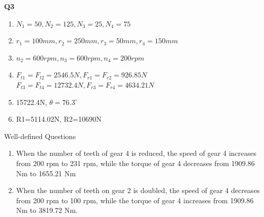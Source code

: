 \documentclass[a4paper, fleqn]{article}
\begin{document}
\textbf{Q3}

\begin{enumerate}
    \item $N_1=50, N_2=125, N_3=25, N_4=75$
    \item $r_1=100mm, r_2=250mm, r_3=50mm, r_4=150mm$
    \item $n_2=600rpm, n_3=600rpm, n_4=200rpm$
    \item $F_{t1}=F_{t2}=2546.5N, F_{r1}=F_{r2}=926.85N$\\
    $F_{t3}=F_{t4}=12732.4N, F_{r3}=F_{r4}=4634.21N$
    \item 15722.4N, $\theta=76.3^\circ$
    \item R1=5114.02N, R2=10690N
\end{enumerate}

Well-defined Questions
\begin{enumerate}[label=(\roman*)]
    \item When the number of teeth of gear 4 is reduced, the speed of gear 4 increases
from 200 rpm to 231 rpm, while the torque of gear 4 decreases from 1909.86 Nm
to 1655.21 Nm
    \item When the number of teeth on gear 2 is doubled, the speed of gear 4 decreases
from 200 rpm to 100 rpm, while the torque of gear 4 increases from 1909.86 Nm
to 3819.72 Nm.
\end{enumerate}
\end{document}
